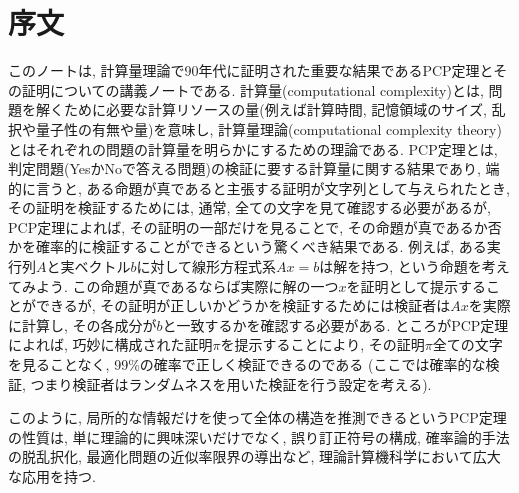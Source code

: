 \chapter*{序文}



このノートは, 計算量理論で90年代に証明された重要な結果であるPCP定理とその証明についての講義ノートである.
計算量(computational complexity)とは, 問題を解くために必要な計算リソースの量(例えば計算時間, 記憶領域のサイズ, 乱択や量子性の有無や量)を意味し, 計算量理論(computational complexity theory)とはそれぞれの問題の計算量を明らかにするための理論である.
PCP定理とは, 判定問題(YesかNoで答える問題)の検証に要する計算量に関する結果であり,
端的に言うと, ある命題が真であると主張する証明が文字列として与えられたとき,
その証明を検証するためには, 通常, 全ての文字を見て確認する必要があるが,
PCP定理によれば, その証明の一部だけを見ることで, その命題が真であるか否かを確率的に検証することができるという驚くべき結果である.
例えば, ある実行列$A$と実ベクトル$b$に対して線形方程式系$Ax=b$は解を持つ, という命題を考えてみよう.
この命題が真であるならば実際に解の一つ$x$を証明として提示することができるが, その証明が正しいかどうかを検証するためには検証者は$Ax$を実際に計算し, その各成分が$b$と一致するかを確認する必要がある.
ところがPCP定理によれば, 巧妙に構成された証明$\pi$を提示することにより, その証明$\pi$全ての文字を見ることなく, 99\%の確率で正しく検証できるのである (ここでは確率的な検証, つまり検証者はランダムネスを用いた検証を行う設定を考える).

このように, 局所的な情報だけを使って全体の構造を推測できるというPCP定理の性質は, 単に理論的に興味深いだけでなく, 誤り訂正符号の構成, 確率論的手法の脱乱択化, 最適化問題の近似率限界の導出など, 理論計算機科学において広大な応用を持つ.